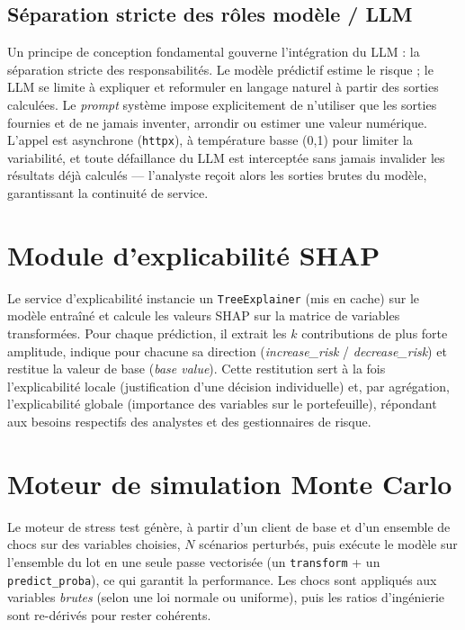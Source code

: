 \documentclass[a4paper,12pt,oneside]{report}
\begin{document}
\subsection{Séparation stricte des rôles modèle / LLM}

Un principe de conception fondamental gouverne l'intégration du LLM : la
séparation stricte des responsabilités. Le modèle prédictif estime le risque ;
le LLM se limite à expliquer et reformuler en langage naturel à partir des
sorties calculées. Le \textit{prompt} système impose explicitement de n'utiliser que
les sorties fournies et de ne jamais inventer, arrondir ou estimer une valeur
numérique. L'appel est asynchrone (\texttt{httpx}), à température basse (0{,}1) pour
limiter la variabilité, et toute défaillance du LLM est interceptée sans
jamais invalider les résultats déjà calculés — l'analyste reçoit alors les sorties
brutes du modèle, garantissant la continuité de service.

\section{Module d'explicabilité SHAP}

Le service d'explicabilité instancie un \texttt{TreeExplainer} (mis en cache) sur le
modèle entraîné et calcule les valeurs SHAP sur la matrice de variables
transformées. Pour chaque prédiction, il extrait les $k$ contributions de plus forte
amplitude, indique pour chacune sa direction (\textit{increase\_risk} /
\textit{decrease\_risk}) et restitue la valeur de base (\textit{base value}). Cette
restitution sert à la fois l'explicabilité locale (justification d'une
décision individuelle) et, par agrégation, l'explicabilité globale
(importance des variables sur le portefeuille), répondant aux besoins respectifs des
analystes et des gestionnaires de risque.

\section{Moteur de simulation Monte Carlo}

Le moteur de stress test génère, à partir d'un client de base et d'un ensemble de
chocs sur des variables choisies, $N$ scénarios perturbés, puis exécute le
modèle sur l'ensemble du lot en une seule passe vectorisée
(un \texttt{transform} + un \texttt{predict\_proba}), ce qui garantit la performance.
Les chocs sont appliqués aux variables \emph{brutes} (selon une loi normale ou
uniforme), puis les ratios d'ingénierie sont re-dérivés pour rester cohérents.
\end{document}
